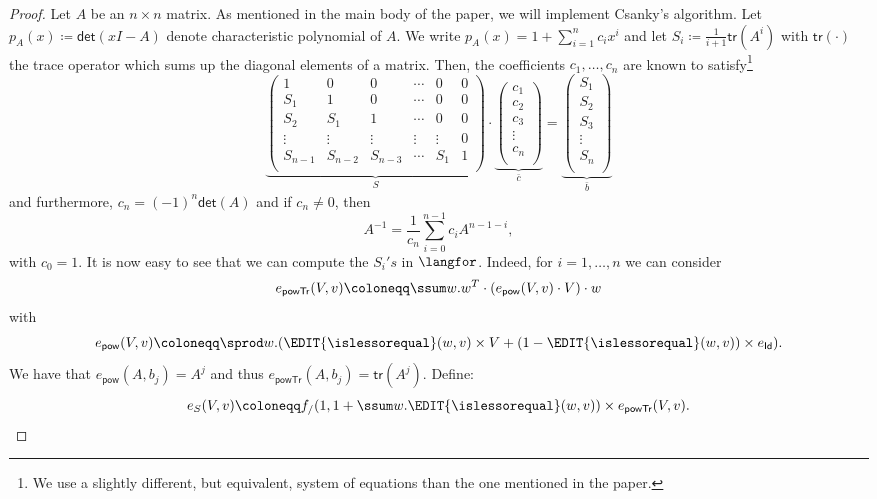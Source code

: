 \begin{proof}
Let $A$ be an $n \times n$ matrix. As mentioned in the main body of the paper, we will implement Csanky's algorithm. Let $p_A(x)\coloneqq \mathsf{det}(xI-A)$ denote  characteristic polynomial of $A$.  We write $p_A(x)=1 + \sum_{i=1}^n c_ix^i$ and let  $S_i\coloneqq \frac{1}{i+1}\mathsf{tr}(A^i)$ with $\mathsf{tr}(\cdot)$ the trace operator which sums up the diagonal elements of a matrix.
Then, the coefficients $c_1,\ldots,c_n$ are known to satisfy\footnote{We use a slightly different, but equivalent, system of equations than the one mentioned in the paper.} 
$$
\underbrace{\left(\begin{matrix}
1 & 0 & 0 & \cdots & 0 & 0\\
S_1 & 1 & 0 & \cdots  &0 & 0\\
S_2 & S_1 & 1 & \cdots  &0 & 0\\
\vdots & \vdots & \vdots & \vdots & \vdots & 0\\
S_{n-1} & S_{n-2} & S_{n-3} & \cdots & S_1 & 1\\
\end{matrix}\right)}_{S}\cdot
\underbrace{\left(\begin{matrix}
c_1\\
c_2\\
c_3\\
\vdots\\
c_n\\
\end{matrix}\right)}_{\bar c}=\underbrace{\left(\begin{matrix}
S_1\\
S_2\\
S_3\\
\vdots\\
S_n\\
\end{matrix}\right)}_{\bar b}
$$
and furthermore, $c_n=(-1)^n\mathsf{det}(A)$ and if $c_{n}\neq 0$, then
$$
A^{-1}=\frac{1}{c_n}\sum_{i=0}^{n-1}c_i A^{n-1-i},
$$
with $c_0=1$. It is now easy to see that we can compute the $S_i's$ in $\langfor$. Indeed, for
$i=1,\ldots,n$ we can consider
$$
e_{\mathsf{powTr}}(V,v)\coloneqq \ssum w. w^T\cdot\left(e_{\mathsf{pow}}(V,v)\cdot V\right)\cdot w
$$
with 
$$
e_{\mathsf{pow}}(V,v)\coloneqq  \sprod w. (\EDIT{\islessorequal}(w,v)\times V+(1-\EDIT{\islessorequal}(w,v))\times e_{\mathsf{Id}}).
$$
We have that $e_{\mathsf{pow}}(A,b_j)=A^{j}$ and thus $e_{\mathsf{powTr}}(A,b_j)=\mathsf{tr}(A^{j})$. Define:
$$
e_{S}(V,v)\coloneqq f_{/}(1, 1 + \ssum w. \EDIT{\islessorequal}(w,v))\times e_{\mathsf{powTr}}(V,v).
$$
\end{proof}
